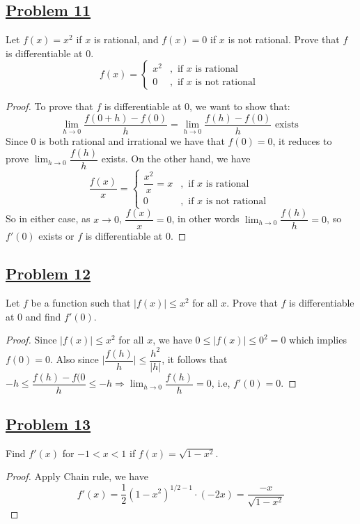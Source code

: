 \documentclass[10pt,letterpaper]{article}
\begin{document}
	\subsection*{{\color{purple}\underline{Problem 11}}}
	Let $f(x) = x^2$ if $x$ is rational, and $f(x) = 0$ if $x$ is not rational. Prove that $f$
	is differentiable at $0$.
	$$f(x) = 
	\begin{cases}
		x^2 &, \text{ if } x \text{ is rational } \\
		0   &, \text{ if } x \text{ is not rational }
	\end{cases}
	$$
	\begin{proof}
	To prove that $f$ is differentiable at $0$, we want to show that:
	$$\displaystyle\lim_{h\to 0} \dfrac{f(0 + h) - f(0)}{h} 
	= \displaystyle\lim_{h\to 0} \dfrac{f(h) - f(0)}{h}
	\text{ exists } $$
	Since $0$ is both rational and irrational we have that $f(0) = 0$, it reduces to prove
	 $\displaystyle\lim_{h\to 0} \dfrac{f(h)}{h}$ exists.
	On the other hand, we have
	$$\dfrac{f(x)}{x} = 
	\begin{cases}
		\dfrac{x^2}{x} = x &, \text{ if } x \text{ is rational } \\
		0 &, \text{ if } x \text{ is not rational }
	\end{cases}
	$$
	So in either case, as $x \rightarrow 0$, $\dfrac{f(x)}{x} = 0$, in other words
	$\displaystyle\lim_{h\to 0} \dfrac{f(h)}{h} = 0$, so $f'(0)$ exists or $f$ is
	differentiable at $0$.
	
	\end{proof}
	
	\subsection*{{\color{purple}\underline{Problem 12}}}
	Let $f$ be a function such that $|f(x)| \leq x^2$ for all $x$. Prove that $f$ is differentiable
	at $0$ and find $f'(0)$.
	\begin{proof}
		Since $|f(x)| \leq x^2$ for all $x$, we have $0 \leq |f(x)| \leq 0^2 = 0$ which implies 
		$f(0) = 0$. 
		Also since $\bigg|\dfrac{f(h)}{h}\bigg| \leq \dfrac{h^2}{|h|}$, it follows
		that $ -h \leq \dfrac{f(h) - f(0}{h} \leq -h \Rightarrow \displaystyle\lim_{h\to 0}\dfrac{f(h)}{h} = 0$, i.e, $f'(0) = 0$.
	\end{proof}
	
	
	\subsection*{{\color{purple}\underline{Problem 13}}}
	Find $f'(x)$ for $-1 < x < 1$ if $f(x) = \sqrt{1 - x^2}$.
	\begin{proof}
		Apply Chain rule, we have
		$$f'(x) = \dfrac{1}{2}(1 - x^2)^{1/2 - 1} \cdot (-2x) = \dfrac{-x}{\sqrt{1 - x^2}}$$
	\end{proof}
	
\end{document}
